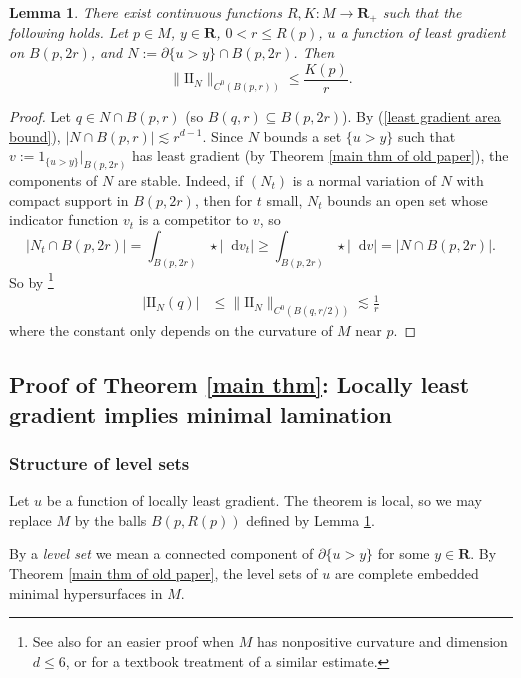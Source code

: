 \documentclass[reqno,11pt]{amsart}
\newcommand{\RR}{\mathbf{R}}
\newcommand*\dif{\mathop{}\!\mathrm{d}}
\newcommand{\Two}{\mathrm{I\!I}}
\newcommand{\dfn}[1]{\emph{#1}\index{#1}}
\newtheorem{lemma}[theorem]{Lemma}
\theoremstyle{definition}
\numberwithin{equation}{section}
\begin{document}
\begin{lemma}\label{choose balls for main thm}
There exist continuous functions $R, K: M \to \RR_+$ such that the following holds.
Let $p \in M$, $y \in \RR$, $0 < r \leq R(p)$, $u$ a function of least gradient on $B(p, 2r)$, and $N := \partial \{u > y\} \cap B(p, 2r)$.
Then
\begin{equation}\label{least gradient curvature bound}
\|\Two_N\|_{C^0(B(p, r))} \leq \frac{K(p)}{r}.
\end{equation}
\end{lemma}
\begin{proof}
Let $q \in N \cap B(p, r)$ (so $B(q, r) \subseteq B(p, 2r)$).
By (\ref{least gradient area bound}), $|N \cap B(p, r)| \lesssim r^{d - 1}$.
Since $N$ bounds a set $\{u > y\}$ such that $v := 1_{\{u > y\}}|_{B(p, 2r)}$ has least gradient (by Theorem \ref{main thm of old paper}), the components of $N$ are stable.
Indeed, if $(N_t)$ is a normal variation of $N$ with compact support in $B(p, 2r)$, then for $t$ small, $N_t$ bounds an open set whose indicator function $v_t$ is a competitor to $v$, so
$$|N_t \cap B(p, 2r)| = \int_{B(p, 2r)} \star |\dif v_t| \geq \int_{B(p, 2r)} \star |\dif v| = |N \cap B(p, 2r)|.$$
So by \cite[pg785, Corollary 1]{Schoen81}\footnote{See also \cite[Theorem 3]{Schoen75} for an easier proof when $M$ has nonpositive curvature and dimension $d \leq 6$, or \cite[Chapter 2, \S\S4-5]{colding2011course} for a textbook treatment of a similar estimate.}
\begin{align*}
|\Two_N(q)| &\leq \|\Two_N\|_{C^0(B(q, r/2))} \lesssim \frac{1}{r}
\end{align*}
where the constant only depends on the curvature of $M$ near $p$.
\end{proof}

\subsection{Proof of Theorem \texorpdfstring{\ref{main thm}}{B}: Locally least gradient implies minimal lamination}
\subsubsection{Structure of level sets}
Let $u$ be a function of locally least gradient.
The theorem is local, so we may replace $M$ by the balls $B(p, R(p))$ defined by Lemma \ref{choose balls for main thm}. 

By a \dfn{level set} we mean a connected component of $\partial \{u > y\}$ for some $y \in \RR$.
By Theorem \ref{main thm of old paper}, the level sets of $u$ are complete embedded minimal hypersurfaces in $M$.
\end{document}
